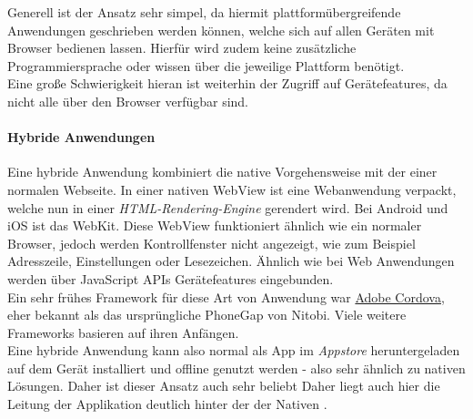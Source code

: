 \noindent
Generell ist der Ansatz sehr simpel, da hiermit plattformübergreifende Anwendungen geschrieben werden können, welche sich auf allen Geräten mit Browser bedienen lassen.
Hierfür wird zudem keine zusätzliche Programmiersprache oder wissen über die jeweilige Plattform benötigt.\\
Eine große Schwierigkeit hieran ist weiterhin der Zugriff auf Gerätefeatures, da nicht alle über den Browser verfügbar sind.

\paragraph{Hybride Anwendungen}
\label{hybride_anwendung}
Eine hybride Anwendung kombiniert die native Vorgehensweise mit der einer normalen Webseite. 
In einer nativen WebView ist eine Webanwendung verpackt, welche nun in einer \textit{HTML-Rendering-Engine} gerendert wird. Bei Android und iOS ist das WebKit.
Diese WebView funktioniert ähnlich wie ein normaler Browser, jedoch werden Kontrollfenster nicht angezeigt, wie zum Beispiel Adresszeile, Einstellungen oder Lesezeichen.
Ähnlich wie bei Web Anwendungen werden über JavaScript APIs Gerätefeatures eingebunden.\\
Ein sehr frühes Framework für diese Art von Anwendung war \href{https://cordova.apache.org/}{Adobe Cordova}, eher bekannt als das ursprüngliche PhoneGap von Nitobi. Viele weitere Frameworks basieren auf ihren Anfängen.\\

\noindent
Eine hybride Anwendung kann also normal als App im \textit{Appstore} heruntergeladen auf dem Gerät installiert und offline genutzt werden - also sehr ähnlich zu nativen Lösungen. Daher ist dieser Ansatz auch sehr beliebt
Daher liegt auch hier die Leitung der Applikation deutlich hinter der der Nativen \cite{lachgar2017} \cite{bjorn-hansen2020}.

